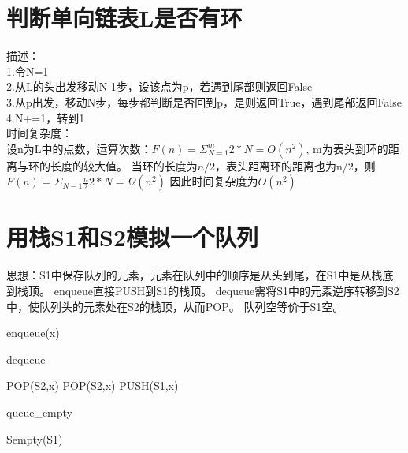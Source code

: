 \documentclass[UTF8]{ctexart}
\begin{document}
\section{判断单向链表L是否有环}%
描述：\\
1.令N=1\\
2.从L的头出发移动N-1步，设该点为p，若遇到尾部则返回False\\
3.从p出发，移动N步，每步都判断是否回到p，是则返回True，遇到尾部返回False\\
4.N+=1，转到1\\
时间复杂度：\\
设n为L中的点数，运算次数：$F(n) = \Sigma_{N=1}^{m} 2*N = O(n^2)$, m为表头到环的距离与环的长度的较大值。
当环的长度为$n/2$，表头距离环的距离也为n/2，则$F(n) = \Sigma_{N-1}{\frac{n}{2}} 2*N = \Omega(n^2)$
因此时间复杂度为$O(n^2)$

\section{}%

\section{用栈S1和S2模拟一个队列}%
思想：S1中保存队列的元素，元素在队列中的顺序是从头到尾，在S1中是从栈底到栈顶。
enqueue直接PUSH到S1的栈顶。
dequeue需将S1中的元素逆序转移到S2中，使队列头的元素处在S2的栈顶，从而POP。
队列空等价于S1空。

\begin{algorithm}
\caption{enqueue(x)}
\begin{algorithmic}
\end{algorithmic}
\end{algorithm}

\begin{algorithm}
\caption{dequeue}
\begin{algorithmic}
\ENDWHILE
{}
\STATE POP(S2,x)
	\STATE POP(S2,x)
	\STATE PUSH(S1,x)
\ENDWHILE
{}
\end{algorithmic}
\end{algorithm}

\begin{algorithm}
\caption{queue\_empty}
\begin{algorithmic}
\RETURN Sempty(S1)
\end{algorithmic}
\end{algorithm}
\end{document}
